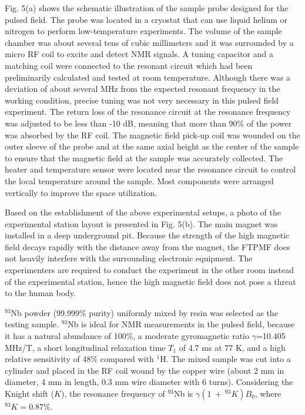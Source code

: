 \documentclass[lettersize,journal]{IEEEtran}
\begin{document}
Fig. 5(a) shows the schematic illustration of the sample probe designed for the pulsed field. The probe was located in a cryostat that can use liquid helium or nitrogen to perform low-temperature experiments. The volume of the sample chamber was about several tens of cubic millimeters and it was surrounded by a micro RF coil to excite and detect NMR signals. A tuning capacitor and a matching coil were connected to the resonant circuit which had been preliminarily calculated and tested at room temperature. Although there was a deviation of about several MHz from the expected resonant frequency in the working condition, precise tuning was not very necessary in this pulsed field experiment. The return loss of the resonance circuit at the resonance frequency was adjusted to be less than -10 dB, meaning that more than 90\% of the power was absorbed by the RF coil. The magnetic field pick-up coil was wounded on the outer sleeve of the probe and at the same axial height as the center of the sample to ensure that the magnetic field at the sample was accurately collected. The heater and temperature sensor were located near the resonance circuit to control the local temperature around the sample. Most components were arranged vertically to improve the space utilization.

Based on the establishment of the above experimental setups, a photo of the experimental station layout is presented in Fig. 5(b). The main magnet was installed in a deep underground pit. Because the strength of the high magnetic field decays rapidly with the distance away from the magnet, the FTPMF does not heavily interfere with the surrounding electronic equipment. The experimenters are required to conduct the experiment in the other room instead of the experimental station, hence the high magnetic field does not pose a threat to the human body.

$^{93}$Nb powder (99.999\% purity) uniformly mixed by resin was selected as the testing sample. $^{93}$Nb is ideal for NMR measurements in the pulsed field, because it has a natural abundance of 100\%, a moderate gyromagnetic ratio $\gamma$=10.405 MHz/T, a short longitudinal relaxation time $T_1$ of 4.7 ms at 77 K, and a high relative sensitivity of 48{\%} compared with $^1$H. The mixed sample was cut into a cylinder and placed in the RF coil wound by the copper wire (about 2 mm in diameter, 4 mm in length, 0.3 mm wire diameter with 6 turns).  Considering the Knight shift ($K$), the resonance frequency of $^{93}$Nb is $\gamma \left( 1~+~ ^{93}K \right) B_0$, where $^{93}K= 0.87\%$.
\end{document}
